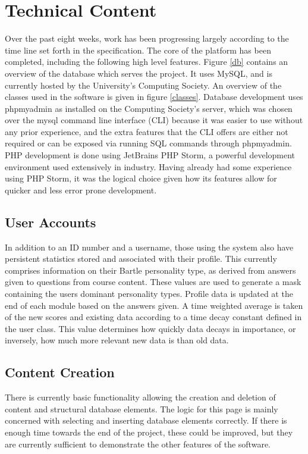 \documentclass[10pt,a4paper]{report}
\begin{document}
\section*{Technical Content}
Over the past eight weeks, work has been progressing largely according to the time line set forth in the specification. The core of the platform has been completed, including the following high level features. Figure \ref{db} contains an overview of the database which serves the project. It uses MySQL, and is currently hosted by the University's Computing Society. An overview of the classes used in the software is given in figure \ref{classes}. Database development uses phpmyadmin as installed on the Computing Society's server, which was chosen over the mysql command line interface (CLI) because it was easier to use without any prior experience, and the extra features that the CLI offers are either not required or can be exposed via running SQL commands through phpmyadmin. PHP development is done using JetBrains PHP Storm, a powerful development environment used extensively in industry. Having already had some experience using PHP Storm, it was the logical choice given how its features allow for quicker and less error prone development.

\subsection*{User Accounts}
In addition to an ID number and a username, those using the system also have persistent statistics stored and associated with their profile. This currently comprises information on their Bartle personality type, as derived from answers given to questions from course content. These values are used to generate a mask containing the users dominant personality types. Profile data is updated at the end of each module based on the answers given. A time weighted average is taken of the new scores and existing data according to a time decay constant defined in the user class. This value determines how quickly data decays in importance, or inversely, how much more relevant new data is than old data.

\subsection*{Content Creation}
There is currently basic functionality allowing the creation and deletion of content and structural database elements. The logic for this page is mainly concerned with selecting and inserting database elements correctly. If there is enough time towards the end of the project, these could be improved, but they are currently sufficient to demonstrate the other features of the software.
\end{document}
